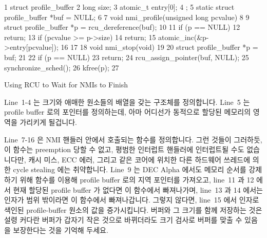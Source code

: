 \begin{listing}[tbp]
{ \scriptsize
\begin{verbbox}
  1 struct profile_buffer {
  2   long size;
  3   atomic_t entry[0];
  4 };
  5 static struct profile_buffer *buf = NULL;
  6
  7 void nmi_profile(unsigned long pcvalue)
  8 {
  9   struct profile_buffer *p = rcu_dereference(buf);
 10
 11   if (p == NULL)
 12     return;
 13   if (pcvalue >= p->size)
 14     return;
 15   atomic_inc(&p->entry[pcvalue]);
 16 }
 17
 18 void nmi_stop(void)
 19 {
 20   struct profile_buffer *p = buf;
 21
 22   if (p == NULL)
 23     return;
 24   rcu_assign_pointer(buf, NULL);
 25   synchronize_sched();
 26   kfree(p);
 27 }
\end{verbbox}
}
\centering
\theverbbox
\caption{Using RCU to Wait for NMIs to Finish}
\label{lst:defer:Using RCU to Wait for NMIs to Finish}
\end{listing}

Line~1-4 는 크기와 애매한 원소들의 배열을 갖는  구조체를
정의합니다.
Line~5 는 profile buffer 로의 포인터를 정의하는데, 아마 어디선가 동적으로
할당된 메모리의 영역을 가리키게 될겁니다.

Line~7-16 은 NMI 핸들러 안에서 호출되는  함수를 정의합니다.
그런 것들이 그러하듯, 이 함수는 preemption 당할 수 없고, 평범한 인터럽트
핸들러에 인터럽트될 수도 없습니다만, 캐시 미스, ECC 에러, 그리고 같은 코어에
위치한 다른 하드웨어 쓰레드에 의한 cycle stealing 에는 취약합니다.
Line~9 는 DEC Alpha 에서도 메모리 순서를 강제하기 위해 
함수를 이용해 profile buffer 로의 지역 포인터를 가져오고, line~11 과 12 에서
현재 할당된 profile buffer 가 없다면 이 함수에서 빠져나가며, line~13 과 14
에서는  인자가 범위 밖이라면 이 함수에서 빠져나갑니다.
그렇지 않다면, line~15 에서   인자로 색인된 profile-buffer 원소의
값을 증가시킵니다.
버퍼와 그 크기를 함께 저장하는 것은 설령 커다란 버퍼가 갑자기 작은 것으로
바뀌더라도 크기 검사로 버퍼를 맞출 수 있음을 보장한다는 것을 기억해 두세요.

